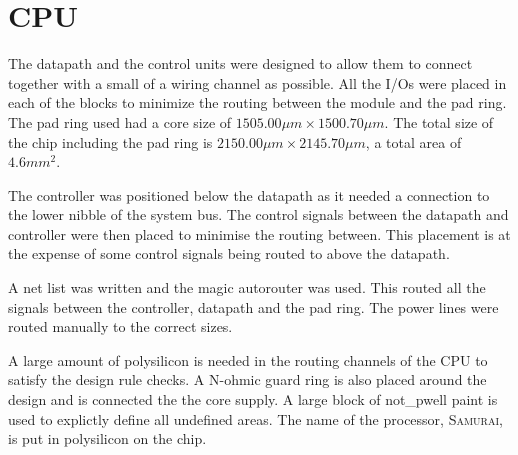 

\section{CPU}


The datapath and the control units were designed to allow them to connect together with a small of a wiring channel as possible. 
All the I/Os were placed in each of the blocks to minimize the routing between the module and the pad ring. 
The pad ring used had a core size of $1505.00\mu m \times 1500.70\mu m$. 
The total size of the chip including the pad ring is $ 2150.00\mu m \times 2145.70\mu m$, a total area of $4.6mm^2$.

The controller was positioned below the datapath as it needed a connection to the lower nibble of the system bus. 
The control signals between the datapath and controller were then placed to minimise the routing between. 
This placement is at the expense of some control signals being routed to above the datapath. 

A net list was written and the magic autorouter was used.
This routed all the signals between the controller, datapath and the pad ring. 
The power lines were routed manually to the correct sizes. 

A large amount of polysilicon is needed in the routing channels of the CPU to satisfy the design rule checks. 
A N-ohmic guard ring is also placed around the design and is connected the the core supply.
A large block of not\_pwell paint is used to explictly define all undefined areas. 
The name of the processor, \textsc{Samurai}, is put in polysilicon on the chip.
